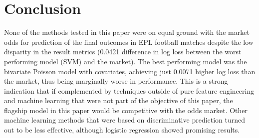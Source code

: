 \documentclass{article}
\begin{document}
\section{Conclusion}
None of the methods tested in this paper were on equal ground with the market odds for prediction of the final outcomes in EPL football matches despite the low disparity in the result metrics (0.0421 difference in log loss between the worst performing model (SVM) and the market). The best performing model was the bivariate Poisson model with covariates, achieving just 0.0071 higher log loss than the market, thus being marginally worse in performance. This is a strong indication that if complemented by techniques outside of pure feature engineering and machine learning that were not part of the objective of this paper, the flagship model in this paper would be competitive with the odds market. Other machine learning methods that were based on discriminative prediction turned out to be less effective, although logistic regression showed promising results. 
\end{document}
